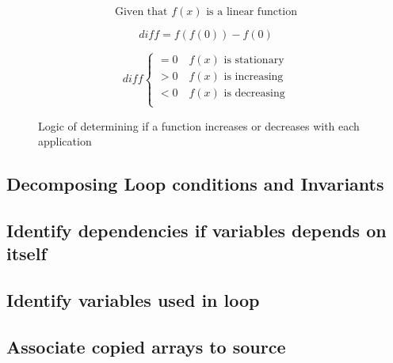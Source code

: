 \begin{figure}
    $$\text{Given that } f(x) \text{ is a linear function}$$

    $$diff = f(f(0)) - f(0)$$

    \[
        diff \begin{cases}
            = 0 \quad f(x) \text{ is stationary}\\
            > 0 \quad f(x) \text{ is increasing}\\
            < 0 \quad f(x) \text{ is decreasing}\\
        \end{cases}
    \]
    \caption{Logic of determining if a function increases or decreases with
    each application}
\label{math:simple-mutation}
\end{figure}

\subsection{Decomposing Loop conditions and Invariants}\label{s:cond-decompose}


\subsection{Identify dependencies if variables depends on itself}\label{s:self-deps}


\subsection{Identify variables used in loop}\label{s:loop-vars}


\subsection{Associate copied arrays to source}\label{s:copied-array}




